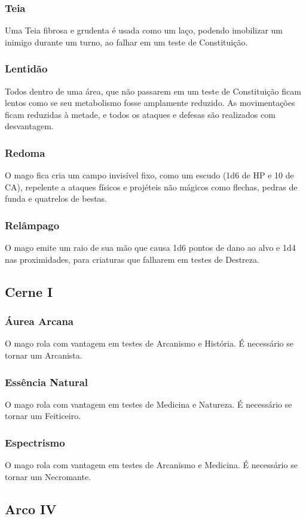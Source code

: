 \documentclass[10pt,twoside,twocolumn]{book}
\begin{document}
\subsubsection*{Teia}
Uma Teia fibrosa e grudenta é usada como um laço, podendo imobilizar um inimigo durante um turno, ao falhar em um teste de Constituição.
\subsubsection*{Lentidão}
Todos dentro de uma área, que não passarem em um teste de Constituição ficam lentos como se seu metabolismo fosse amplamente reduzido. As movimentações ficam reduzidas à metade, e todos os ataques e defesas são realizados com desvantagem.
\subsubsection*{Redoma}
O mago fica cria um campo invisível fixo, como um escudo (1d6 de HP e 10 de CA), repelente a ataques físicos e projéteis não mágicos como flechas, pedras de funda e quatrelos de bestas.
\subsubsection*{Relâmpago}
O mago emite um raio de sua mão que causa 1d6 pontos de dano ao alvo e 1d4 nas proximidades, para criaturas que falharem em testes de Destreza.

\subsection*{Cerne I}
\subsubsection*{Áurea Arcana}
O mago rola com vantagem em testes de Arcanismo e História. É necessário se tornar um Arcanista.
\subsubsection*{Essência Natural}
O mago rola com vantagem em testes de Medicina e Natureza. É necessário se tornar um Feiticeiro.
\subsubsection*{Espectrismo}
O mago rola com vantagem em testes de Arcanismo e Medicina. É necessário se tornar um Necromante.

\subsection*{Arco IV}
\end{document}
